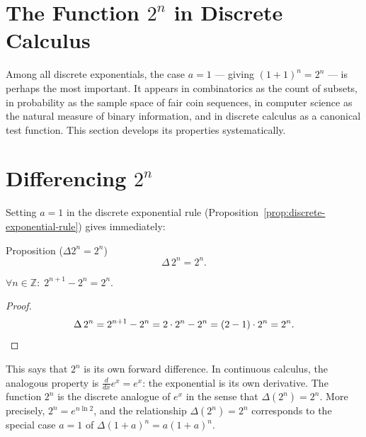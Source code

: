 
\section{The Function \(2^n\) in Discrete Calculus}
\label{subsec:two-to-the-n}

Among all discrete exponentials, the case \(a = 1\) — giving \((1+1)^n = 2^n\)
— is perhaps the most important. It appears in combinatorics as the count
of subsets, in probability as the sample space of fair coin sequences, in
computer science as the natural measure of binary information, and in discrete
calculus as a canonical test function. This section develops its properties
systematically.

\section*{Differencing \(2^n\)}

Setting \(a = 1\) in the discrete exponential rule
(Proposition~\ref{prop:discrete-exponential-rule}) gives immediately:

\begin{propositionbox}{Proposition (\(\Delta 2^n = 2^n\))}
\[
\Delta\, 2^n = 2^n.
\]
\end{propositionbox}
\label{prop:delta-two-n}

\begin{remark*}
\(\forall n \in \mathbb{Z}:\; 2^{n+1} - 2^n = 2^n\).
\end{remark*}

\begin{proof}
\[
\Delta\, 2^n = 2^{n+1} - 2^n = 2\cdot 2^n - 2^n = (2-1)\cdot 2^n = 2^n. \qedhere
\]
\end{proof}

\begin{remark*}
This says that \(2^n\) is its own forward difference. In continuous calculus,
the analogous property is \(\tfrac{d}{dx}e^x = e^x\): the exponential is its
own derivative. The function \(2^n\) is the discrete analogue of \(e^x\)
in the sense that \(\Delta(2^n) = 2^n\). More precisely, \(2^n = e^{n \ln 2}\),
and the relationship \(\Delta(2^n) = 2^n\) corresponds to the special case
\(a = 1\) of \(\Delta(1+a)^n = a(1+a)^n\).
\end{remark*}

